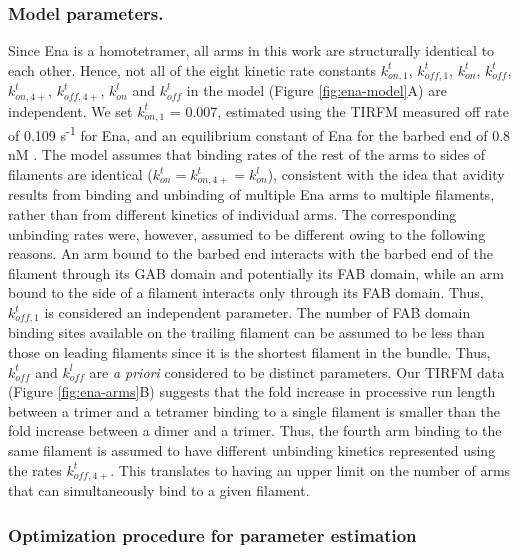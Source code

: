 \subsubsection{Model parameters.}\label{ena-si-parameters}
Since Ena is a homotetramer, all arms in this work are structurally identical to each other. Hence, not all of the eight kinetic rate constants $k_{on,1}^{t}$, $k_{off,1}^{t}$, $k_{on}^{t}$, $k_{off}^{t}$, $k_{on,4+}^{t}$, $k_{off,4+}^{t}$,  $k_{on}^{l}$ and $k_{off}^{l}$ in the model (Figure \ref{fig:ena-model}A) are independent. We set $k_{on,1}^{t}$ = 0.007, estimated using the TIRFM measured off rate of 0.109 s\textsuperscript{-1} for Ena, and an equilibrium constant of Ena for the barbed end of 0.8 nM \citep{winkelman_ena/vasp_2014}. The model assumes that binding rates of the rest of the arms to sides of filaments are identical ($k_{on}^{t} = k_{on,4+}^{t} = k_{on}^{l}$), consistent with the idea that avidity results from binding and unbinding of multiple Ena arms to multiple filaments, rather than from different kinetics of individual arms.  The corresponding unbinding rates were, however, assumed to be different owing to the following reasons. An arm bound to the barbed end interacts with the barbed end of the filament through its GAB domain and potentially its FAB domain, while an arm bound to the side of a filament interacts only through its FAB domain. Thus, $k_{off,1}^{t}$ is considered an independent parameter.  The number of FAB domain binding sites available on the trailing filament can be assumed to be less than those on leading filaments since it is the shortest filament in the bundle. Thus, $k_{off}^{t}$ and $k_{off}^{l}$ are \textit{a priori} considered to be distinct parameters. Our TIRFM data (Figure \ref{fig:ena-arms}B) suggests that the fold increase in processive run length between a trimer and a tetramer binding to a single filament is smaller than the fold increase between a dimer and a trimer. Thus, the fourth arm binding to the same filament is assumed to have different unbinding kinetics represented using the rates $k_{off,4+}^{t}$. This translates to having an upper limit on the number of arms that can simultaneously bind to a given filament.

\subsubsection{Optimization procedure for parameter estimation}\label{ena-si-optimization}

